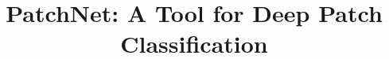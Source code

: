 \documentclass[conference]{IEEEtran}
\begin{document}
\title{PatchNet: A Tool  for Deep Patch Classification}
%

\maketitle










\balance

 
\end{document}
